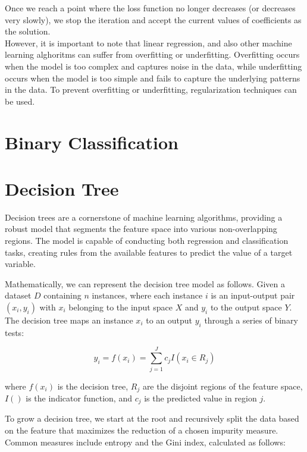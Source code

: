 Once we reach a point where the loss function no longer decreases (or decreases very slowly), we stop the iteration and accept the current values of coefficients as the solution.
\\

However, it is important to note that linear regression, and also other machine learning alghoritms can suffer from overfitting or underfitting. Overfitting occurs when the model is too complex and captures noise in the data, while underfitting occurs when the model is too simple and fails to capture the underlying patterns in the data. To prevent overfitting or underfitting, regularization techniques can be used.

\newpage

\section{Binary Classification}

\section{Decision Tree}
Decision trees are a cornerstone of machine learning algorithms, providing a robust model that segments the feature space into various non-overlapping regions. The model is capable of conducting both regression and classification tasks, creating rules from the available features to predict the value of a target variable.

Mathematically, we can represent the decision tree model as follows. Given a dataset $D$ containing $n$ instances, where each instance $i$ is an input-output pair $(x_i, y_i)$ with $x_i$ belonging to the input space $X$ and $y_i$ to the output space $Y$. The decision tree maps an instance $x_i$ to an output $y_i$ through a series of binary tests:

 \begin{equation}
	y_i = f(x_i) = \sum_{j=1}^{J} c_j I(x_i \in R_j)
\end{equation}


where $f(x_i)$ is the decision tree, $R_j$ are the disjoint regions of the feature space, $I()$ is the indicator function, and $c_j$ is the predicted value in region $j$.

To grow a decision tree, we start at the root and recursively split the data based on the feature that maximizes the reduction of a chosen impurity measure. Common measures include entropy and the Gini index, calculated as follows:

